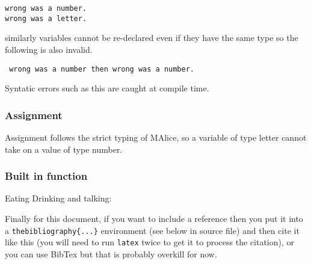 \documentclass[a4wide, 10pt]{article}
\begin{document}
\texttt{wrong was a number.\\wrong was a letter.}

similarly variables cannot be re-declared even if they have the same type so the
following is also invalid.

\texttt{ wrong was a number then wrong was a number.}

Syntatic errors such as this are caught at compile time.


\subsubsection{Assignment}
Assignment follows the strict typing of MAlice, so a variable of type letter 
cannot take on a value of type number.


\subsubsection{Built in function}
Eating Drinking and talking: 




Finally for this document, if you want to include a reference
then you put it into a \texttt{thebibliography\{...\}}
environment (see below in source file) and then 
cite it like this \cite{lamport94}
(you will need to run \texttt{latex} twice to get it to process the citation),
or you can use BibTex but that is probably overkill for now.

\end{document}
